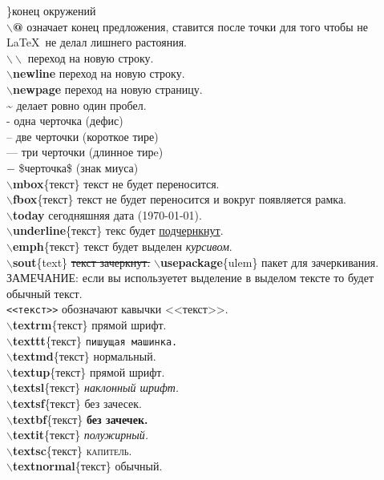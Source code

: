 \documentclass{article}
\newcommand{\bb}[1]{{\bfseries $\backslash$#1}} %
\begin{document}
\}конец окружений\\

\bb{@} означает конец предложения, ставится после точки для того чтобы не \LaTeX~не делал лишнего растояния.\\
$\backslash \backslash$ переход на новую строку.\\
\bb{newline} переход на новую строку.\\
\bb{newpage} переход на новую страницу.\\
\~{} делает ровно один пробел.\\
- одна черточка (дефис)\\
-- две черточки (короткое тире)\\
--- три черточки (длинное тирe)\\
$-$ \$черточка\$ (знак миуса)\\	
\bb{mbox}\{текст\} текст не будет переносится.\\
\bb{fbox}\{текст\} текст не будет переносится и вокруг появляется рамка.\\
\bb{today} сегодняшняя дата (\today).\\
\bb{underline}\{текст\} текс будет \underline{подчернкнут}.\\
\bb{emph}\{текст\} текст будет выделен \emph{курсивом}.\\
\bb{sout}\{text\} \sout{текст зачеркнут.} \bb{usepackage}\{ulem\} пакет для зачеркивания.\\
ЗАМЕЧАНИЕ: если вы используетет выделение в выделом тексте то будет обычный текст.\\
\verb|<<текст>>| обозначают кавычки <<текст>>.\\

\bb{textrm}\{текст\} \textrm{прямой шрифт}.\\
\bb{texttt}\{текст\} \texttt{пишущая машинка.}\\
\bb{textmd}\{текст\} \textmd{нормальный.}\\
\bb{textup}\{текст\} \textup{прямой шрифт.}\\
\bb{textsl}\{текст\} \textsl{наклонный шрифт.}\\
\bb{textsf}\{текст\} \textsf{без зачесек.}\\
\bb{textbf}\{текст\} \textbf{без зачечек.}\\
\bb{textit}\{текст\} \textit{полужирный.}\\
\bb{textsc}\{текст\} \textsc{капитель.}\\
\bb{textnormal}\{текст\} \textnormal{обычный.}\\
\end{document}
